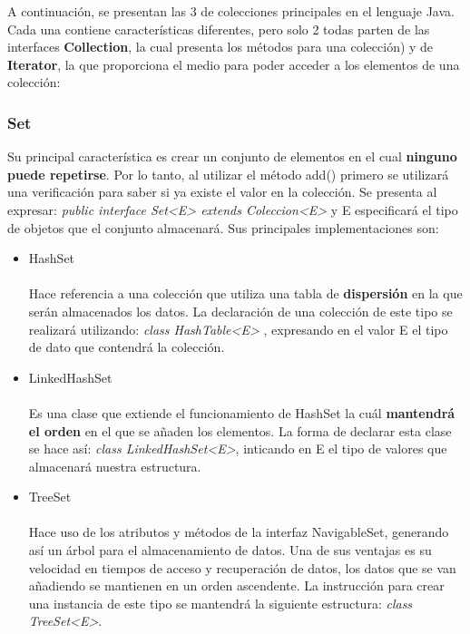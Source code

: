 \documentclass[12pt]{report}
\begin{document}
\newpage
A continuación, se presentan las 3 de colecciones principales en el lenguaje Java. Cada una contiene características diferentes, pero solo 2 todas parten de las interfaces \textbf{Collection}, la cual presenta los métodos para una colección) y de \textbf{Iterator}, la que proporciona el medio para poder acceder a los elementos de una colección:

\subsubsection{Set}
Su principal característica es crear un conjunto de elementos en el cual \textbf{ninguno puede repetirse}. Por lo tanto, al utilizar el método add() primero se utilizará una verificación para saber si ya existe el valor en la colección. Se presenta al expresar: \textit{public interface Set<E> extends Coleccion<E>} y E especificará el tipo de objetos que el conjunto almacenará. \cite{ORACLE}
Sus principales implementaciones son:
\begin{itemize}
    \item HashSet \\ \\Hace referencia a una colección que utiliza una tabla de \textbf{dispersión} en la que serán almacenados los datos. La declaración de una colección de este tipo se realizará utilizando: \textit{class HashTable<E>} , expresando en el valor E el tipo de dato que contendrá la colección.
    \item LinkedHashSet\\ \\Es una clase que extiende el funcionamiento de HashSet la cuál \textbf{mantendrá el orden} en el que se añaden los elementos. La forma de declarar esta clase se hace así: \textit{class LinkedHashSet<E>}, inticando en E el tipo de valores que almacenará nuestra estructura. 
    \item TreeSet\\ \\ Hace uso de los atributos y métodos de la interfaz NavigableSet, generando así un árbol para el almacenamiento de datos. Una de sus ventajas es su velocidad en tiempos de acceso y recuperación de datos, los datos que se van añadiendo se mantienen en un orden ascendente. La instrucción para crear una instancia de este tipo se mantendrá la siguiente estructura: \textit{class TreeSet<E>}.
\end{itemize}
\end{document}
